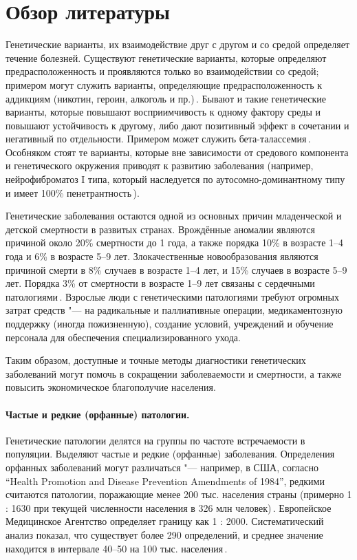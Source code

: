 \documentclass[a4paper,14pt]{extarticle}
\begin{document}
\section{Обзор литературы}

Генетические варианты, их взаимодействие друг с другом и со средой определяет течение болезней.
Существуют генетические варианты, которые определяют предрасположенность и проявляются только во взаимодействии со средой; примером могут служить варианты, определяющие предрасположенность к аддикциям (никотин, героин, алкоголь и пр.)\,\cite{Hiroi_2004}.
Бывают и такие генетические варианты, которые повышают восприимчивость к одному фактору среды и повышают устойчивость к другому, либо дают позитивный эффект в сочетании и негативный по отдельности.
Примером может служить бета-талассемия\,\cite{Galanello_2010}.
Особняком стоят те варианты, которые вне зависимости от средового компонента и генетического окружения приводят к развитию заболевания (например, нейрофиброматоз I типа, который наследуется по аутосомно-доминантному типу и имеет 100\% пенетрантность\,\cite{Jett_2009}).

Генетические заболевания остаются одной из основных причин младенческой и детской смертности в развитых странах.
Врождённые аномалии являются причиной около 20\% смертности до 1 года, а также порядка 10\% в возрасте 1--4 года и 6\% в возрасте 5--9 лет.
Злокачественные новообразования являются причиной смерти в 8\% случаев в возрасте 1--4 лет, и 15\% случаев в возрасте 5--9 лет.
Порядка 3\% от смертности в возрасте 1--9 лет связаны с сердечными патологиями\,\cite{Field_2003}.
Взрослые люди с генетическими патологиями требуют огромных затрат средств "--- на радикальные и паллиативные операции, медикаментозную поддержку (иногда пожизненную), создание условий, учреждений и обучение персонала для обеспечения специализированного ухода.

Таким образом, доступные и точные методы диагностики генетических заболеваний могут помочь в сокращении заболеваемости и смертности, а также повысить экономическое благополучие населения.

\paragraph{Частые и редкие (орфанные) патологии.}
Генетические патологии делятся на группы по частоте встречаемости в популяции.
Выделяют частые и редкие (орфанные) заболевания.
Определения орфанных заболеваний могут различаться "--- например, в США, согласно \textenglish{``Health Promotion and Disease Prevention Amendments of 1984''}, редкими считаются патологии, поражающие менее 200 тыс. населения страны (примерно 1 : 1630 при текущей численности населения в 326 млн человек)\,\cite{Herder_2017}.
Европейское Медицинское Агентство определяет границу как 1 : 2000.
Систематический анализ показал, что существует более 290 определений, и среднее значение находится в интервале 40--50 на 100 тыс. населения\,\cite{Richter_2015}.
\end{document}
